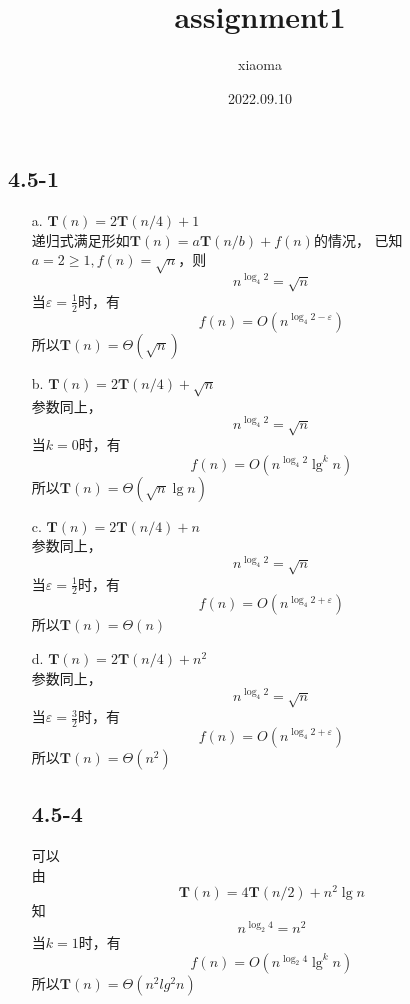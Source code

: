 \documentclass[12pt, a4paper, oneside]{ctexart}
\title{assignment1}
\author{xiaoma}
\date{2022.09.10}
\begin{document}
\maketitle
\subsection*{4.5-1}
\begin{itemize}
    \item [a.] $\mathbf{T} (n)=2\mathbf{T} (n / 4)+1$\\
    递归式满足形如$\mathbf{T} (n)=a\mathbf{T} (n/b)+f(n)$的情况，
    已知$a=2\geqslant 1,f(n)=\sqrt{n} $，则
    $$n^{\log _{4}2}=\sqrt{n}$$
    当$\varepsilon = \frac{1}{2} $时，有
    $$f(n)=O (n^{\log _{4}2-\varepsilon })$$
    所以$\mathbf{T} (n)=\Theta (\sqrt{n})$
    \item [b.] $\mathbf{T} (n)=2\mathbf{T} (n/4)+\sqrt{n}$\\
    参数同上，
    $$n^{\log _{4}2}=\sqrt{n}$$
    当$k = 0$时，有
    $$f(n)=O (n^{\log _{4}2}\lg^{k}n)$$
    所以$\mathbf{T} (n)=\Theta (\sqrt{n}\lg n)$
    \item [c.] $\mathbf{T} (n)=2\mathbf{T} (n/4)+n$\\
    参数同上，
    $$n^{\log _{4}2}=\sqrt{n}$$
    当$\varepsilon = \frac{1}{2} $时，有
    $$f(n)=O (n^{\log _{4}2+\varepsilon })$$
    所以$\mathbf{T} (n)=\Theta (n)$
    \item [d.] $\mathbf{T} (n)=2\mathbf{T} (n/4)+n^{2}$\\
    参数同上，
    $$n^{\log _{4}2}=\sqrt{n}$$
    当$\varepsilon = \frac{3}{2} $时，有
    $$f(n)=O (n^{\log _{4}2+\varepsilon })$$
    所以$\mathbf{T} (n)=\Theta (n^{2})$\\
\subsection*{4.5-4}
    可以\\
    由$$\mathbf{T} (n)=4\mathbf{T} (n / 2)+n^{2}\lg n$$
    知$$n^{\log _{2}4}=n^{2}$$
    当$k=1$时，有
    $$f(n)=O (n^{\log _{2}4}\lg^{k}n)$$
    所以$\mathbf{T} (n)=\Theta (n^{2}lg^{2}n)$
\end{itemize}
\end{document}
